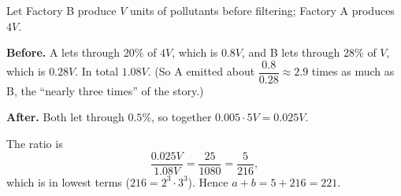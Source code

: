 Let Factory B produce $V$ units of pollutants before filtering; Factory A produces $4V$.

\textbf{Before.} A lets through $20\%$ of $4V$, which is $0.8V$, and B lets through $28\%$ of $V$, which is $0.28V$. In total $1.08V$. (So A emitted about $\dfrac{0.8}{0.28}\approx2.9$ times as much as B, the ``nearly three times'' of the story.)

\textbf{After.} Both let through $0.5\%$, so together $0.005\cdot5V=0.025V$.

The ratio is
\[
\dfrac{0.025V}{1.08V}=\dfrac{25}{1080}=\dfrac{5}{216},
\]
which is in lowest terms ($216=2^3\cdot3^3$). Hence $a+b=5+216=\boxed{221}$.
